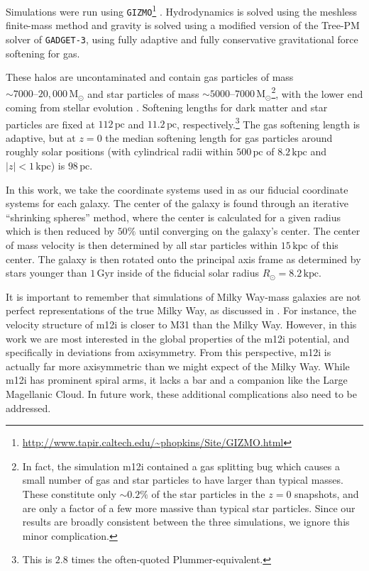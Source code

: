 \documentclass[twocolumn]{aastex62}
\newcommand{\Msun}{\text{M}_\odot}
\newcommand{\pc}{\text{pc}}
\newcommand{\kpc}{\text{kpc}}
\newcommand{\Gyr}{\text{Gyr}}
\newcommand{\abs}[1]{\left| #1 \right|}
\begin{document}
Simulations were run using
\texttt{GIZMO}\footnote{\url{http://www.tapir.caltech.edu/~phopkins/Site/GIZMO.html}}
\citep{2015MNRAS.450...53H}. Hydrodynamics is solved using the meshless
finite-mass method and gravity is solved using a modified version of the
Tree-PM solver of \texttt{GADGET-3}, using fully adaptive and fully
conservative gravitational force softening for gas.

These halos are uncontaminated and contain gas particles of mass $\sim 7000
\text{--} 20,000\,\Msun$ and star particles of mass $\sim 5000 \text{--} 7000\,
\Msun$\footnote{In fact, the simulation m12i contained a gas
splitting bug which causes a small number of gas and star particles to have
larger than typical masses. These constitute only $\sim0.2\%$ of the star
particles in the $z=0$ snapshots, and are only a factor of a few more massive
than typical star particles. Since our results are broadly consistent between
the three simulations, we ignore this minor complication.}, with the lower end
coming from stellar evolution \citep{2018arXiv180610564S}. Softening lengths
for dark matter and star particles are fixed at $112\,\pc$ and $11.2\,\pc$,
respectively.\footnote{This is $2.8$ times the often-quoted
Plummer-equivalent.} The gas softening length is adaptive, but at $z=0$ the
median softening length for gas particles around roughly solar positions (with
cylindrical radii within $500\,\pc$ of $8.2\,\kpc$ and $\abs{z}<1\,\kpc$) is
$98\,\pc$.

In this work, we take the coordinate systems used in
\citet{2018arXiv180610564S} as our fiducial coordinate systems for each
galaxy. The center of the galaxy is found through an iterative ``shrinking
spheres'' method, where the center is calculated for a given radius which is
then reduced by $50\%$ until converging on the galaxy's center. The center of
mass velocity is then determined by all star particles within $15\,\kpc$ of
this center. The galaxy is then rotated onto the principal axis frame as
determined by stars younger than $1\,\Gyr$ inside of the fiducial solar radius
$R_{\odot} = 8.2\,\kpc$.


It is important to remember that simulations of Milky Way-mass galaxies are
not perfect representations of the true Milky Way, as discussed in
\citet{2018arXiv180610564S}. For instance, the velocity structure of m12i is
closer to M31 than the Milky Way. However, in this work we are most interested
in the global properties of the m12i potential, and specifically in deviations
from axisymmetry. From this perspective, m12i is actually far more
axisymmetric than we might expect of the Milky Way. While m12i has prominent
spiral arms, it lacks a bar and a companion like the Large Magellanic Cloud.
In future work, these additional complications also need to be addressed.
\end{document}
